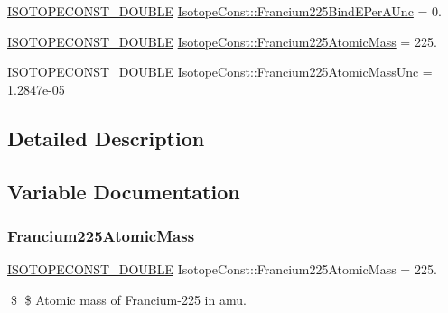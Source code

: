 \begin{DoxyCompactItemize}
\mbox{\hyperlink{group___isotope_const-_macros_ga8f45a7272ce02c0b4c65c44636ed719a}{I\+S\+O\+T\+O\+P\+E\+C\+O\+N\+S\+T\+\_\+\+D\+O\+U\+B\+LE}} \mbox{\hyperlink{group___isotope_const-_francium-_fr225_ga6f851219319627bac088917757a0afe9}{Isotope\+Const\+::\+Francium225\+Bind\+E\+Per\+A\+Unc}} = 0.
\item 
\mbox{\hyperlink{group___isotope_const-_macros_ga8f45a7272ce02c0b4c65c44636ed719a}{I\+S\+O\+T\+O\+P\+E\+C\+O\+N\+S\+T\+\_\+\+D\+O\+U\+B\+LE}} \mbox{\hyperlink{group___isotope_const-_francium-_fr225_ga374115a672746ca2cc7d41bdf9d04b15}{Isotope\+Const\+::\+Francium225\+Atomic\+Mass}} = 225.
\item 
\mbox{\hyperlink{group___isotope_const-_macros_ga8f45a7272ce02c0b4c65c44636ed719a}{I\+S\+O\+T\+O\+P\+E\+C\+O\+N\+S\+T\+\_\+\+D\+O\+U\+B\+LE}} \mbox{\hyperlink{group___isotope_const-_francium-_fr225_gac3162b50eb56b17891252856204960e3}{Isotope\+Const\+::\+Francium225\+Atomic\+Mass\+Unc}} = 1.\+2847e-\/05
\end{DoxyCompactItemize}


\subsection{Detailed Description}


\subsection{Variable Documentation}
\mbox{\label{group___isotope_const-_francium-_fr225_ga374115a672746ca2cc7d41bdf9d04b15}} 
\subsubsection{\texorpdfstring{Francium225\+Atomic\+Mass}{Francium225AtomicMass}}
{\footnotesize\ttfamily \mbox{\hyperlink{group___isotope_const-_macros_ga8f45a7272ce02c0b4c65c44636ed719a}{I\+S\+O\+T\+O\+P\+E\+C\+O\+N\+S\+T\+\_\+\+D\+O\+U\+B\+LE}} Isotope\+Const\+::\+Francium225\+Atomic\+Mass = 225.}

\$ \$ Atomic mass of Francium-\/225 in amu. \mbox{\label{group___isotope_const-_francium-_fr225_gac3162b50eb56b17891252856204960e3}} 
